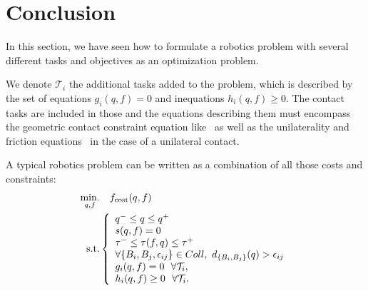 \section{Conclusion}
\label{sec:Ch1_Conclusion}


In this section, we have seen how to formulate a robotics problem with several different tasks and objectives as an optimization problem.

We denote $\mathcal{T}_i$ the additional tasks added to the problem, which is described by the set of equations $g_i(q,f) = 0$ and inequations $h_i(q,f) \geq 0$.
The contact tasks are included in those and the equations describing them must encompass the geometric contact constraint equation like~ as well as the unilaterality and friction equations~ in the case of a unilateral contact.

A typical robotics problem can be written as a combination of all those costs and constraints:
\begin{align}
\operatorname*{min.}_{q, f} & \quad f_\text{cost}(q,f) \nonumber\\
\text{s.t.}&
\left\{
\begin{array}{lr}
q^- \le q \le q^+\\
s(q,f) = 0 \\
\tau^- \le \tau(f,q) \le \tau^+\\
\forall \{B_i, B_j, \epsilon_{ij}\} \in Coll,\ d_{\{B_i, B_j\}}(q) > \epsilon_{ij}\\
g_i(q,f) = 0\ \ \forall\mathcal{T}_i,\\
h_i(q,f) \geq 0\ \ \forall\mathcal{T}_i.
\end{array}\right.
\label{eq:PG}
\end{align}

